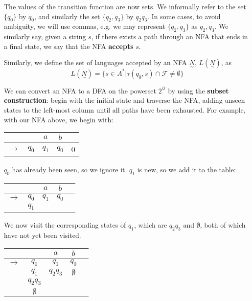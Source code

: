 The values of the transition function are now sets. We informally refer to the set $\{q_0\}$ by $q_0$, and similarly the set $\{q_2, q_3\}$ by $q_2q_3$. In some cases, to avoid ambiguity, we will use commas, e.g. we may represent $\{q_2, q_3\}$ as $q_2,q_3$. We similarly say, given a string $s$, if there exists a path through an NFA that ends in a final state, we say that the NFA \textbf{accepts} $s$.

Similarly, we define the set of languages accepted by an NFA $\underset{\sim}{N}$, $L(\underset{\sim}{N})$, as \[L(\underset{\sim}{N}) = \{s\in A^*|\tau(q_0, s)\cap\mathcal{F}\neq\emptyset\}\]

We can convert an NFA to a DFA on the powerset $2^{\mathcal{Q}}$ by using the \textbf{subset construction}: begin with the initial state and traverse the NFA, adding unseen states to the left-most column until all paths have been exhausted. For example, with our NFA above, we begin with:

\begin{center}\begin{tabular}{c c|c c r}
         & & $a$ & $b$ & \\\hline
    $\to$ & $q_0$ & $q_1$ & $q_0$ & 0 \\
\end{tabular}\end{center}

$q_0$ has already been seen, so we ignore it. $q_1$ is new, so we add it to the table:

\begin{center}\begin{tabular}{c c|c c r}
         & & $a$ & $b$ & \\\hline
    $\to$ & $q_0$ & $q_1$ & $q_0$ &  \\
          & $q_1$ &       &       & 
\end{tabular}\end{center}

We now visit the corresponding states of $q_1$, which are $q_2q_3$ and $\emptyset$, both of which have not yet been visited. 

\begin{center}\begin{tabular}{c c|c c r}
         & & $a$ & $b$ & \\\hline
    $\to$ & $q_0$ & $q_1$ & $q_0$ &  \\
          & $q_1$ & $q_2q_3$ & $\emptyset$ & \\
          & $q_2q_3$ & & & \\
          & $\emptyset$ & & &
\end{tabular}\end{center}

